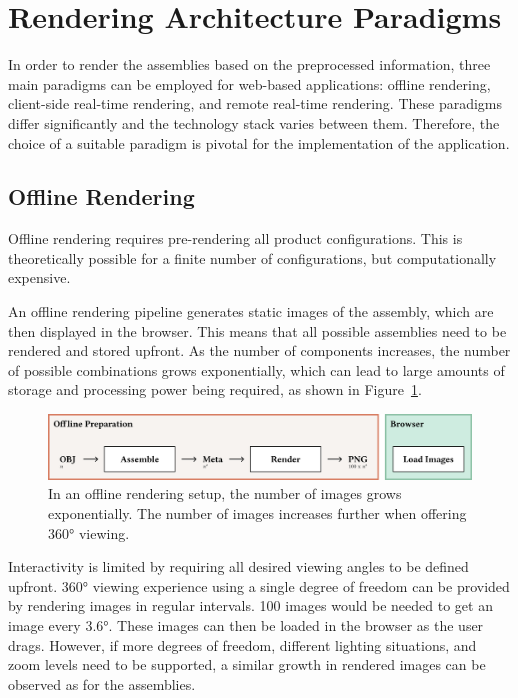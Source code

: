 \section{Rendering Architecture Paradigms}

In order to render the assemblies based on the preprocessed information, three main paradigms can be employed for web-based applications: offline rendering, client-side real-time rendering, and remote real-time rendering. These paradigms differ significantly and the technology stack varies between them. Therefore, the choice of a suitable paradigm is pivotal for the implementation of the application.

\subsection*{Offline Rendering}

Offline rendering requires pre-rendering all product configurations. This is theoretically possible for a finite number of configurations, but computationally expensive. 

An offline rendering pipeline generates static images of the assembly, which are then displayed in the browser. This means that all possible assemblies need to be rendered and stored upfront. As the number of components increases, the number of possible combinations grows exponentially, which can lead to large amounts of storage and processing power being required, as shown in Figure~\ref{fig:cad-offline}.

\begin{figure}[H]
  \includegraphics[width=\columnwidth]{resources/cad-pipeline-offline.png}
  \caption{In an offline rendering setup, the number of images grows exponentially. The number of images increases further when offering 360° viewing.}
  \label{fig:cad-offline}
\end{figure}

Interactivity is limited by requiring all desired viewing angles to be defined upfront. 360° viewing experience using a single degree of freedom can be provided by rendering images in regular intervals. 100 images would be needed to get an image every 3.6°. These images can then be loaded in the browser as the user drags. However, if more degrees of freedom, different lighting situations, and zoom levels need to be supported, a similar growth in rendered images can be observed as for the assemblies.

